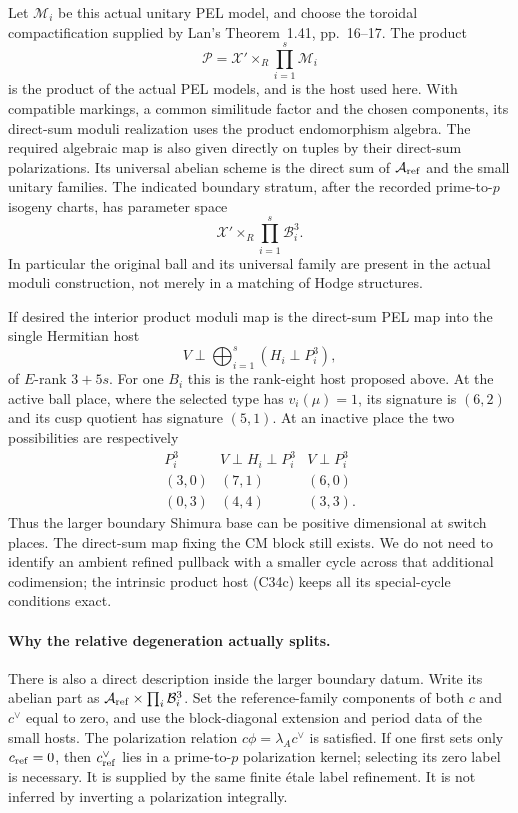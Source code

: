 \documentclass[11pt]{article}
\providecommand{\mathscr}[1]{\mathcal{#1}}
\theoremstyle{definition}\newtheorem{definition}[theorem]{Definition}\newtheorem{remark}[theorem]{Remark}
\begin{document}
Let $\mathscr M_i$ be this actual unitary
PEL model, and choose the toroidal
compactification supplied by Lan's
Theorem~1.41, pp.~16--17. The product
\[
             \mathscr P=\mathcal X'\times_R
                             \prod_{i=1}^{s}\mathscr M_i
                                                        \tag{C34c}
\]
is the product of the actual PEL
models, and is the host used here.
With compatible markings, a common
similitude factor and the chosen
components, its direct-sum moduli
realization uses the product
endomorphism algebra. The required
algebraic map is also given directly
on tuples by their direct-sum
polarizations. Its universal
abelian scheme is the direct sum of
$\mathcal A_{\rm ref}$ and the small
unitary families. The indicated boundary
stratum, after the recorded prime-to-$p$
isogeny charts, has parameter space
\[
             \mathcal X'\times_R
                             \prod_{i=1}^{s}\mathcal B_i^3.
                                                        \tag{C34d}
\]
In particular the original ball and its
universal family are present in the
actual moduli construction, not merely
in a matching of Hodge structures.

If desired the interior product moduli
map is the direct-sum PEL map into the
single Hermitian host
\[
             V\perp\bigoplus_{i=1}^{s}(H_i\perp P_i^3),
                                                        \tag{C34e}
\]
of $E$-rank $3+5s$. For one $B_i$ this
is the rank-eight host proposed above.
At the active ball place, where the
selected type has $v_i(\mu)=1$, its
signature is $(6,2)$ and its cusp
quotient has signature $(5,1)$. At an
inactive place the two possibilities
are respectively
\[
 \begin{array}{c|c|c}
 P_i^3&V\perp H_i\perp P_i^3&V\perp P_i^3\\ \hline
 (3,0)&(7,1)&(6,0)\\
 (0,3)&(4,4)&(3,3).
 \end{array}                                           \tag{C34f}
\]
Thus the larger boundary Shimura base
can be positive dimensional at switch
places. The direct-sum map fixing the
CM block still exists. We do not need
to identify an ambient refined pullback
with a smaller cycle across that
additional codimension; the intrinsic
product host (C34c) keeps all its
special-cycle conditions exact.

\paragraph{Why the relative degeneration actually splits.}
There is also a direct description inside
the larger boundary datum. Write its
abelian part as
$\mathcal A_{\rm ref}\times\prod_i\mathcal B_i^3$.
Set the reference-family components of
both $c$ and $c^\vee$ equal to zero,
and use the block-diagonal extension
and period data of the small hosts.
The polarization relation
$c\phi=\lambda_Ac^\vee$ is satisfied.
If one first sets only $c_{\rm ref}=0$,
then $c^\vee_{\rm ref}$ lies in a
prime-to-$p$ polarization kernel;
selecting its zero label is necessary.
It is supplied by the same finite
\'etale label refinement. It is not
inferred by inverting a polarization
integrally.
\end{document}
